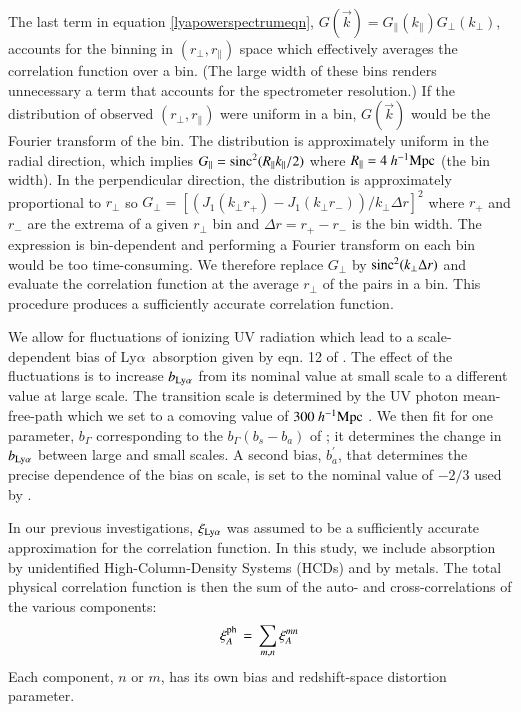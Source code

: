 \documentclass{aa}
\newcommand{\xicosmo}{\xi^{\rm ph}}
\newcommand{\xilya}{\xi_{\rm Ly\alpha}}
\newcommand{\hMpc}{h^{-1}{\rm Mpc}}
\newcommand{\Lya}{Ly$\alpha$~}
\newcommand{\rperp}{r_\perp}
\newcommand{\rpar}{r_\parallel}
\newcommand{\blya}{b_{\rm Ly\alpha}}
\begin{document}
  The last term in equation \ref{lyapowerspectrumeqn},
  $G(\vec{k})=G_\parallel(k_\parallel)G_\perp(k_\perp)$, accounts for
  the binning in $(\rperp,\rpar)$ space which effectively
  averages the correlation function over a bin.
(The large width of these bins renders unnecessary a term that
  accounts for the spectrometer resolution.)
  If the distribution of observed $(\rperp,\rpar)$ were uniform
  in a bin, $G(\vec{k})$ would be the Fourier transform of the bin.
  The distribution is approximately uniform
in the radial direction, which implies
$G_\parallel={\rm sinc}^2(R_\parallel k_\parallel/2)$ where
$R_\parallel=4~\hMpc$ (the bin width).
In the perpendicular direction,
the distribution is approximately proportional to $\rperp$
so
$G_\perp=[(J_1(k_\perp r_+)-J_1(k_\perp r_-))/k_\perp\Delta r]^2$
where $r_+$ and $r_-$ are the extrema of a given $\rperp$ bin
and $\Delta r=r_+-r_-$ is the bin width.
The expression is bin-dependent and performing a Fourier transform
on each bin
would be too time-consuming. We therefore
replace $G_\perp$ by
${\rm sinc^2}(k_\perp \Delta r)$ and evaluate the
correlation function at the average $\rperp$ of the pairs in a bin.
This procedure produces a sufficiently accurate correlation function.


We allow for
fluctuations of ionizing UV radiation 
\citep{2014PhRvD..89h3010P,2014MNRAS.442..187G} which lead to
a scale-dependent bias of \Lya absorption 
given by eqn. 12 of \citet{2014MNRAS.442..187G}.
The effect of the fluctuations is to increase $\blya$ from
its nominal value at small scale to a different value at
large scale.  The transition scale is determined by the
UV photon mean-free-path which we set to a comoving value of $300~\hMpc$
\citep{2013ApJ...769..146R}.
We then fit for one parameter, $b_\Gamma$ corresponding
to the $b_\Gamma(b_s-b_a)$ of \citet{2014MNRAS.442..187G}; it
determines the change
in $\blya$ between large and small scales.
A second bias, $b_a^\prime$, that determines the precise dependence
of the bias on scale, is set to the nominal value of $-2/3$
used by \citet{2014MNRAS.442..187G}.

In our previous investigations, $\xilya$ was assumed to be a sufficiently
accurate approximation for the correlation function.
In this study, we include absorption
by unidentified High-Column-Density Systems (HCDs) and by metals.
The total physical correlation function is then the sum
of the auto- and cross-correlations of the various components:
\begin{equation}
\xicosmo_A\, =\, \sum_{m,n}\xi^{mn}_A
\end{equation}
Each component, $n$ or $m$,
has its own bias and redshift-space distortion parameter.
\end{document}
